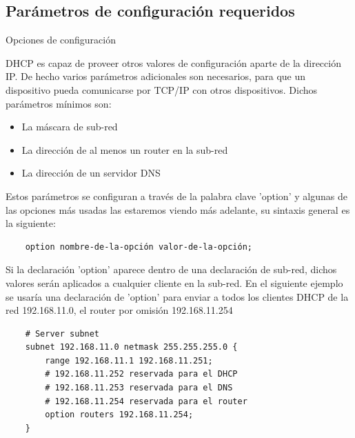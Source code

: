 \subsection{Parámetros de configuración requeridos} %


\begin{frame}{Opciones de configuración}

    DHCP es capaz de proveer otros valores de configuración aparte de la
    dirección IP. De hecho varios parámetros adicionales son necesarios, para
    que un dispositivo pueda comunicarse por TCP/IP con otros dispositivos.
    Dichos parámetros mínimos son:\\[0.2cm]

    \begin{itemize}
        \item La máscara de sub-red
        \item La dirección de al menos un router en la sub-red
        \item La dirección de un servidor DNS
    \end{itemize}

    Estos parámetros se configuran a través de la palabra clave 'option' y
    algunas de las opciones más usadas las estaremos viendo más adelante, su
    sintaxis general es la siguiente:\\[0.2cm]

    \begin{verbatim}
    option nombre-de-la-opción valor-de-la-opción;
    \end{verbatim}

    Si la declaración 'option' aparece dentro de una declaración de sub-red,
    dichos valores serán aplicados a cualquier cliente en la sub-red. En el 
    siguiente ejemplo se usaría una declaración de 'option' para enviar a todos
    los clientes DHCP de la red 192.168.11.0, el router por omisión
    192.168.11.254 
     
    \begin{verbatim}
    # Server subnet
    subnet 192.168.11.0 netmask 255.255.255.0 {
        range 192.168.11.1 192.168.11.251;
        # 192.168.11.252 reservada para el DHCP 
        # 192.168.11.253 reservada para el DNS 
        # 192.168.11.254 reservada para el router 
        option routers 192.168.11.254;
    }
    \end{verbatim}


\end{frame}
